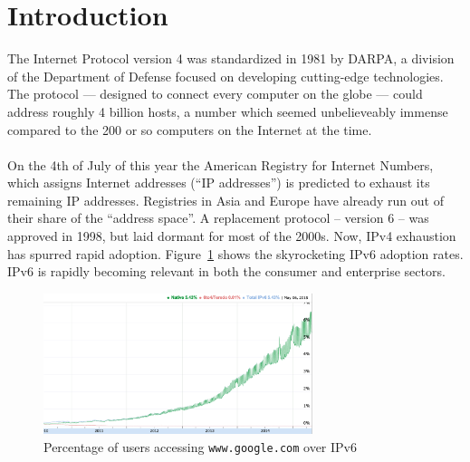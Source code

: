 \documentclass[12pt]{article}
\begin{document}
\section{Introduction}
The Internet Protocol version 4 was standardized in 1981 by DARPA, a division of the Department of Defense focused on developing cutting-edge technologies. The protocol --- designed to connect every computer on the globe --- could address roughly 4 billion hosts, a number which seemed unbelieveably immense compared to the 200 or so computers on the Internet at the time.\\\\
On the 4th of July of this year the American Registry for Internet Numbers, which assigns Internet addresses (``IP addresses'') is predicted to exhaust its remaining IP addresses. Registries in Asia and Europe have already run out of their share of the ``address space''.  A replacement protocol -- version 6 -- was approved in 1998, but laid dormant for most of the 2000s. Now, IPv4 exhaustion has spurred rapid adoption. Figure~\ref{fig:v6_adoption} shows the skyrocketing IPv6 adoption rates. IPv6 is rapidly becoming relevant in both the consumer and enterprise sectors.

\begin{figure}[ht!]
  \centering
  \includegraphics[width=0.7\textwidth]{v6_adoption.png}
  \caption{Percentage of users accessing \texttt{www.google.com} over IPv6}
  \label{fig:v6_adoption}
\end{figure}
\end{document}
